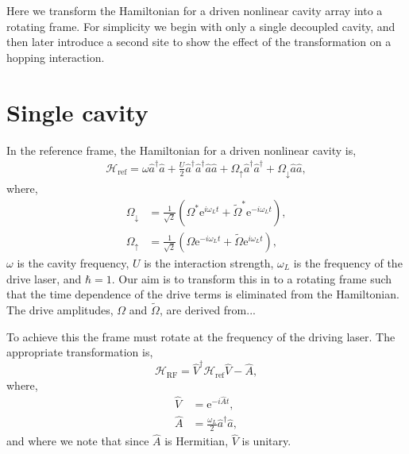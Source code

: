 Here we transform the Hamiltonian for a driven nonlinear cavity array into a rotating frame. For simplicity we begin with only a single decoupled cavity, and then later introduce a second site to show the effect of the transformation on a hopping interaction.

\section{Single cavity}

In the reference frame, the Hamiltonian for a driven nonlinear cavity is,
\begin{align}
	\mathcal{H}_{\mathrm{ref}} = \omega\hat{a}^{\dagger}\hat{a} + \frac{U}{2}\hat{a}^{\dagger}\hat{a}^{\dagger}\hat{a}\hat{a} + \Omega_{\uparrow}\hat{a}^{\dagger}\hat{a}^{\dagger} + \Omega_{\downarrow}\hat{a}\hat{a},
	\label{eq:rot1}
\end{align}
where, 
\begin{align}
	\Omega_{\downarrow} &= \frac{1}{\sqrt{2}} \left( \Omega^{*}\mathrm{e}^{i\omega_{L}t} + \tilde{\Omega}^{*}\mathrm{e}^{-i\omega_{L}t} \right), \label{eq:rot2} \\
	\Omega_{\uparrow} &= \frac{1}{\sqrt{2}} \left(\Omega\mathrm{e}^{-i\omega_{L}t} + \tilde{\Omega}\mathrm{e}^{i\omega_{L}t}\right), \label{eq:rot3}
\end{align}
\(\omega\) is the cavity frequency, \(U\) is the interaction strength, \(\omega_{L}\) is the frequency of the drive laser, and \(\hbar = 1\). Our aim is to transform this in to a rotating frame such that the time dependence of the drive terms is eliminated from the Hamiltonian. The drive amplitudes, \(\Omega\) and \(\tilde{\Omega}\), are derived from...

To achieve this the frame must rotate at the frequency of the driving laser. The appropriate transformation is,
\begin{equation}
	\mathcal{H}_{\mathrm{RF}} = \hat{V}^{\dagger}\mathcal{H}_{\mathrm{ref}}\hat{V} - \hat{A},
	\label{eq:rot4}
\end{equation}
where,
\begin{align}
	\hat{V} &= \mathrm{e}^{-i\hat{A}t}, \label{eq:rot5} \\
	\hat{A} &= \frac{\omega_{L}}{2} \hat{a}^{\dagger}\hat{a}, \label{eq:rot6}
\end{align}
and where we note that since \(\hat{A}\) is Hermitian, \(\hat{V}\) is unitary.

